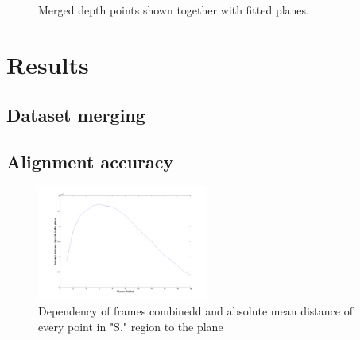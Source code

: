 \documentclass{article}
\begin{document}
\begin{figure}[h!]
    \centering
      \caption{Merged depth points shown together with fitted planes.}
\end{figure}
\section{Results}

\subsection{Dataset merging}

\subsection{Alignment accuracy}
\begin{figure}[h!]
  \centering
  \includegraphics[width=0.5\textwidth]{figs/plane_angle_error_versus_foundation_plane}
  \caption{Dependency of frames combinedd and absolute mean distance of every point in "S." region to the plane}
  \label{fig:plane_angle_error_versus_foundation_plane}
\end{figure}
\end{document}
